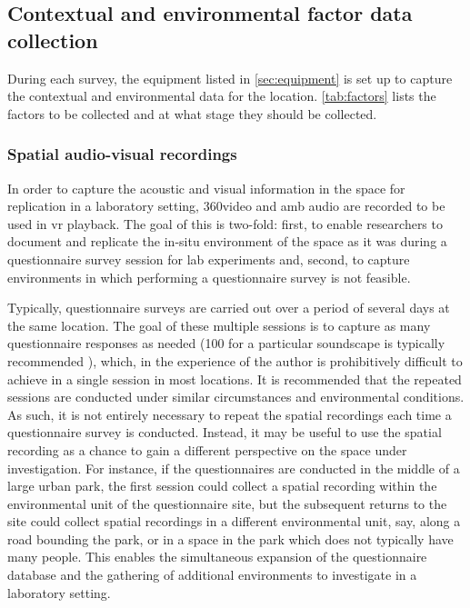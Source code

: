  \subsection{Contextual and environmental factor data collection}

   During each survey, the equipment listed in \cref{sec:equipment} is set up to capture the contextual and environmental data for the location. \cref{tab:factors} lists the factors to be collected and at what stage they should be collected.

   \subsubsection{Spatial audio-visual recordings}

   In order to capture the acoustic and visual information in the space for replication in a laboratory setting, 360\degree video and \gls{amb} audio are recorded to be used in \gls{vr} playback. The goal of this is two-fold: first, to enable researchers to document and replicate the in-situ environment of the space as it was during a questionnaire survey session for lab experiments and, second, to capture environments in which performing a questionnaire survey is not feasible.

   Typically, questionnaire surveys are carried out over a period of several days at the same location. The goal of these multiple sessions is to capture as many questionnaire responses as needed (100 for a particular soundscape is typically recommended \citep{Engel2018Review}), which, in the experience of the author is prohibitively difficult to achieve in a single session in most locations. It is recommended that the repeated sessions are conducted under similar circumstances and environmental conditions. As such, it is not entirely necessary to repeat the spatial recordings each time a questionnaire survey is conducted. Instead, it may be useful to use the spatial recording as a chance to gain a different perspective on the space under investigation. For instance, if the questionnaires are conducted in the middle of a large urban park, the first session could collect a spatial recording within the environmental unit of the questionnaire site, but the subsequent returns to the site could collect spatial recordings in a different environmental unit, say, along a road bounding the park, or in a space in the park which does not typically have many people. This enables the simultaneous expansion of the questionnaire database and the gathering of additional environments to investigate in a laboratory setting.

